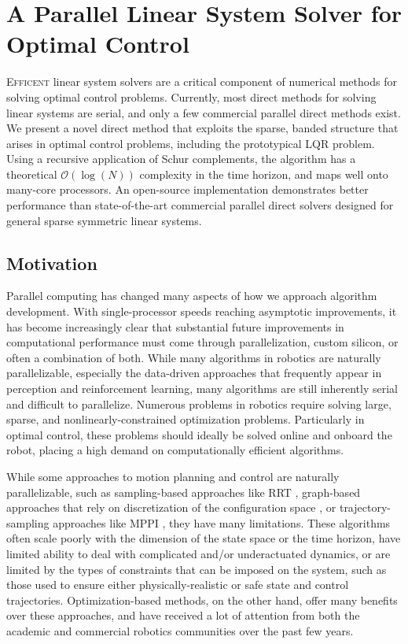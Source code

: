 \documentclass[../root.tex]{subfiles}
\newcommand{\0}{{\transparent{0} \resizebox{\mycellheight}{\mycellheight}{0}}}
\begin{document}
\chapter{A Parallel Linear System Solver for Optimal Control} \label{chap:rslqr}

\lettrine{E}{fficent} linear system solvers are a critical component of
numerical methods for solving optimal control problems.  Currently, most direct
methods for solving linear systems are serial, and only a few commercial
parallel direct methods exist.  We present a novel direct method that exploits
the sparse, banded structure that arises in optimal control problems, including
the prototypical LQR problem. Using a recursive application of Schur
complements, the algorithm has a theoretical $\mathcal{O}(\log(N))$ complexity
in the time horizon, and maps well onto many-core processors. An open-source
implementation demonstrates better performance than state-of-the-art commercial
parallel direct solvers designed for general sparse symmetric linear systems.

\section{Motivation} Parallel computing has changed many aspects of how we approach
algorithm development.  With single-processor speeds reaching asymptotic improvements, it
has become increasingly clear that substantial future improvements in computational
performance must come through parallelization, custom silicon, or often a combination of
both. While many algorithms in robotics are naturally parallelizable, especially the
data-driven approaches that frequently appear in perception and reinforcement learning, many
algorithms are still inherently serial and difficult to parallelize.  Numerous problems in robotics require solving large, sparse, and
nonlinearly-constrained optimization problems. Particularly in optimal control, these problems should 
ideally be solved online and onboard the robot, placing a high demand on computationally
efficient algorithms.

While some approaches to motion planning and control are naturally parallelizable, such as
sampling-based approaches like RRT \cite{lavalle_Rapidlyexploring_2001}, graph-based approaches that
rely on discretization of the configuration space \cite{lavalle_Planning_2006}, or
trajectory-sampling approaches like MPPI \cite{williams_Aggressive_2016}, they have many 
limitations. These algorithms often scale poorly with the dimension of the state space or
the time horizon, have limited ability to deal with complicated and/or underactuated
dynamics, or are limited by the types of constraints that can be imposed on the system, such
as those used to ensure either physically-realistic or safe state and control trajectories.
Optimization-based methods, on the other hand, offer many benefits over these approaches, 
and have received a lot of attention from both the academic and commercial robotics
communities over the past few years.
\end{document}
